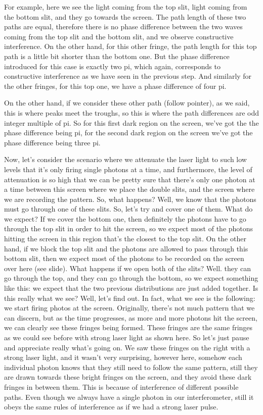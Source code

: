 For example, here we see the light coming from the top slit, light coming from the bottom slit, and they go towards the screen. The path length of these two paths are equal, therefore there is no phase difference between the two waves coming from the top slit and the bottom slit, and we observe constructive interference. On the other hand, for this other fringe, the path length for this top path is a little bit shorter than the bottom one. But the phase difference introduced for this case is exactly two pi, which again, corresponds to constructive interference as we have seen in the previous step. And similarly for the other fringes, for this top one, we have a phase difference of four pi.

On the other hand, if we consider these other path (follow pointer), as we said, this is where peaks meet the troughs, so this is where the path differences are odd integer multiple of pi. So for this first dark region on the screen, we've got the the phase difference being pi, for the second dark region on the screen we've got the phase difference being three pi.

Now, let's consider the scenario where we attenuate the laser light to such low levels that it's only firing single photons at a time, and furthermore, the level of attenuation is so high that we can be pretty sure that there's only one photon at a time between this screen where we place the double slits, and the screen where we are recording the pattern. So, what happens? Well, we know that the photons must go through one of these slits. So, let's try and cover one of them. What do we expect? If we cover the bottom one, then definitely the photons have to go through the top slit in order to hit the screen, so we expect most of the photons hitting the screen in this region that's the closest to the top slit. On the other hand, if we block the top slit and the photons are allowed to pass through this bottom slit, then we expect most of the photons to be recorded on the screen over here (see slide). What happens if we open both of the slits? Well. they can go through the top, and they can go through the bottom, so we expect something like this: we expect that the two previous distributions are just added together. Is this really what we see? Well, let's find out. In fact, what we see is the following: we start firing photos at the screen. Originally, there's not much pattern that we can discern, but as the time progresses, as more and more photons hit the screen, we can clearly see these fringes being formed. These fringes are the same fringes as we could see before with strong laser light as shown here. So let's just pause and appreciate really what's going on. We saw these fringes on the right with a strong laser light, and it wasn't very surprising, however here, somehow each individual photon knows that they still need to follow the same pattern, still they are drawn towards these bright fringes on the screen, and they avoid these dark fringes in between them. This is because of interference of different possible paths. Even though we always have a single photon in our interferometer, still it obeys the same rules of interference as if we had a strong laser pulse.


